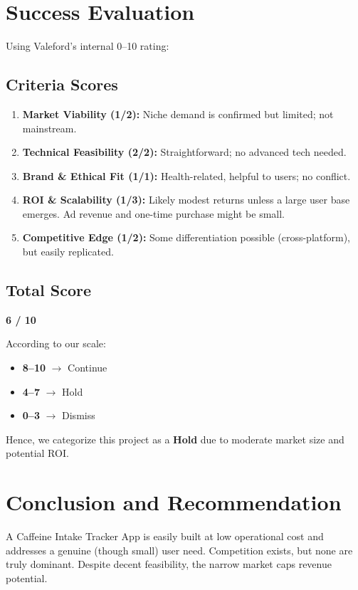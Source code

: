 \documentclass[12pt]{article}
\begin{document}
\section{Success Evaluation}

Using Valeford’s internal 0--10 rating:

\subsection{Criteria Scores}
\begin{enumerate}[leftmargin=2em]
    \item \textbf{Market Viability (1/2):} Niche demand is confirmed but limited; not mainstream.
    \item \textbf{Technical Feasibility (2/2):} Straightforward; no advanced tech needed.
    \item \textbf{Brand \& Ethical Fit (1/1):} Health-related, helpful to users; no conflict.
    \item \textbf{ROI \& Scalability (1/3):} Likely modest returns unless a large user base 
          emerges. Ad revenue and one-time purchase might be small.
    \item \textbf{Competitive Edge (1/2):} Some differentiation possible (cross-platform), 
          but easily replicated. 
\end{enumerate}

\subsection{Total Score}
\begin{center}
\textbf{6 / 10} 
\end{center}

\noindent
According to our scale:
\begin{itemize}
    \item \textbf{8--10} $\rightarrow$ Continue
    \item \textbf{4--7} $\rightarrow$ Hold
    \item \textbf{0--3} $\rightarrow$ Dismiss
\end{itemize}

Hence, we categorize this project as a \textbf{Hold} due to moderate market size 
and potential ROI.

\section{Conclusion and Recommendation}
A Caffeine Intake Tracker App is easily built at low operational cost and addresses 
a genuine (though small) user need. Competition exists, but none are truly dominant. 
Despite decent feasibility, the narrow market caps revenue potential. 
\end{document}
